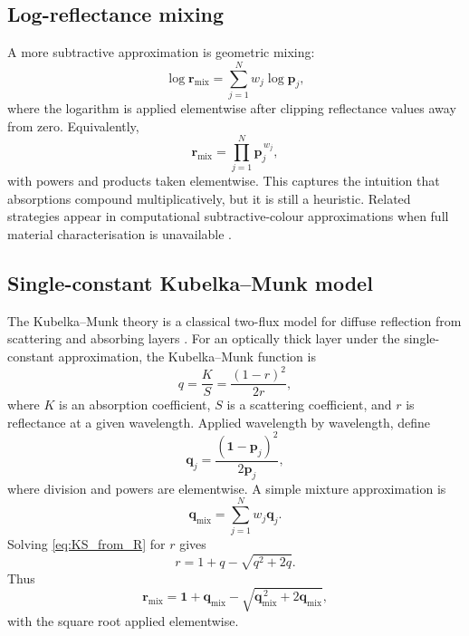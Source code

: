 \documentclass[11pt,a4paper]{article}
\newcommand{\ones}{\mathbf{1}}
\newcommand{\vect}[1]{\boldsymbol{#1}}
\begin{document}
\subsection{Log-reflectance mixing}

A more subtractive approximation is geometric mixing:
\begin{equation}
 \log \vect{r}_{\mathrm{mix}}=\sum_{j=1}^{N}w_j\log \vect{p}_j,
 \label{eq:log_mixing}
\end{equation}
where the logarithm is applied elementwise after clipping reflectance values away from zero. Equivalently,
\begin{equation}
 \vect{r}_{\mathrm{mix}}=\prod_{j=1}^{N}\vect{p}_j^{\,w_j},
\end{equation}
with powers and products taken elementwise. This captures the intuition that absorptions compound multiplicatively, but it is still a heuristic. Related strategies appear in computational subtractive-colour approximations when full material characterisation is unavailable \citep{Burns2017Subtractive}.

\subsection{Single-constant Kubelka--Munk model}

The Kubelka--Munk theory is a classical two-flux model for diffuse reflection from scattering and absorbing layers \citep{KubelkaMunk1931,Kubelka1948,Myrick2011}. For an optically thick layer under the single-constant approximation, the Kubelka--Munk function is
\begin{equation}
 q=\frac{K}{S}=\frac{(1-r)^2}{2r},
 \label{eq:KS_from_R}
\end{equation}
where $K$ is an absorption coefficient, $S$ is a scattering coefficient, and $r$ is reflectance at a given wavelength. Applied wavelength by wavelength, define
\begin{equation}
 \vect{q}_j=\frac{(\ones-\vect{p}_j)^2}{2\vect{p}_j},
 \label{eq:q_component}
\end{equation}
where division and powers are elementwise. A simple mixture approximation is
\begin{equation}
 \vect{q}_{\mathrm{mix}}=\sum_{j=1}^{N}w_j\vect{q}_j.
 \label{eq:q_mix}
\end{equation}
Solving \cref{eq:KS_from_R} for $r$ gives
\begin{equation}
 r=1+q-\sqrt{q^2+2q}.
 \label{eq:R_from_Q_scalar}
\end{equation}
Thus
\begin{equation}
 \vect{r}_{\mathrm{mix}}=\ones+\vect{q}_{\mathrm{mix}}-
 \sqrt{\vect{q}_{\mathrm{mix}}^{\,2}+2\vect{q}_{\mathrm{mix}}},
 \label{eq:R_from_Q_vector}
\end{equation}
with the square root applied elementwise.
\end{document}
